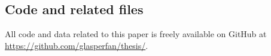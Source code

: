 \documentclass[11pt]{article}
\begin{document}
\subsection{Code and related files}

All code and data related to this paper is freely available on GitHub at\\ \url{https://github.com/glasperfan/thesis/}.

\newpage

\printbibliography
\end{document}
